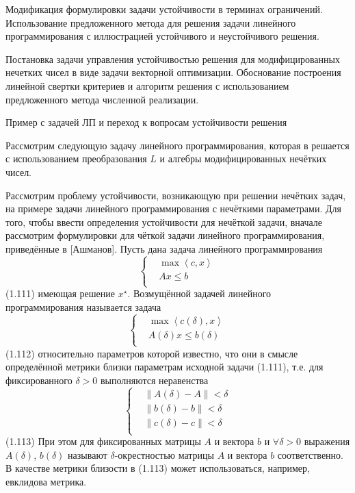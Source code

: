 Модификация формулировки задачи устойчивости в терминах ограничений. Использование предложенного метода для решения задачи линейного программирования с иллюстрацией устойчивого и неустойчивого решения. 

Постановка задачи управления устойчивостью решения для модифицированных нечетких чисел в виде задачи векторной оптимизации. Обоснование построения линейной свертки критериев и алгоритм решения с использованием предложенного метода численной реализации.

Пример с задачей ЛП и переход к вопросам устойчивости решения

Рассмотрим следующую задачу линейного программирования, которая в \cite{Vorontsov_PI} решается с использованием преобразования $L$ и алгебры модифицированных нечётких чисел.


Рассмотрим проблему устойчивости, возникающую при решении нечётких задач, на примере задачи линейного программирования с нечёткими параметрами. Для того, чтобы ввести определения устойчивости для нечёткой задачи, вначале рассмотрим формулировки для чёткой задачи линейного программирования, приведённые в [Ашманов].
Пусть дана задача линейного программирования
	\[\left\{ \begin{aligned}
  & \max \left\langle c,x \right\rangle  \\ 
 & Ax\le b \\ 
\end{aligned} \right.\] 	(1.111)
имеющая решение ${{x}^{\star}}$. Возмущённой задачей линейного программирования называется задача
	\[\left\{ \begin{aligned}
  & \max \left\langle c\left( \delta  \right),x \right\rangle  \\ 
 & A\left( \delta  \right)x\le b\left( \delta  \right) \\ 
\end{aligned} \right.\] 	(1.112)
относительно параметров которой известно, что они в смысле определённой метрики близки параметрам исходной задачи (1.111), т.е. для фиксированного $\delta >0$ выполняются неравенства
	\[\left\{ \begin{aligned}
  & \left\| A\left( \delta  \right)-A \right\|<\delta  \\ 
 & \left\| b\left( \delta  \right)-b \right\|<\delta  \\ 
 & \left\| c\left( \delta  \right)-c \right\|<\delta  \\ 
\end{aligned} \right.\] 	(1.113)
При этом для фиксированных матрицы $A$ и вектора $b$ и $\forall \delta >\text{0}$ выражения $A\left( \delta  \right)$, $b\left( \delta  \right)$ называют $\delta$-окрестностью матрицы $A$ и вектора $b$ соответственно. В качестве метрики близости в (1.113) может использоваться, например, евклидова метрика.
